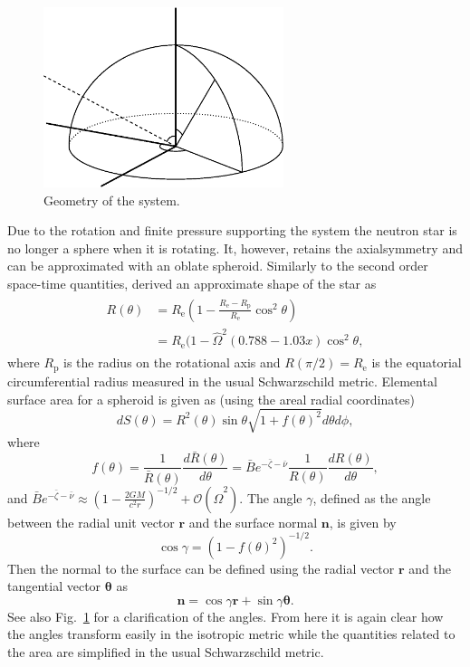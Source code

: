 \documentclass[iop, usenatbib]{emulateapj}
\newcommand{\be}{\begin{equation}}
\newcommand{\ee}{\end{equation}}
\renewcommand{\vec}[1]{\ensuremath{\boldsymbol{#1}}​}
\newcommand{\Req}{\ensuremath{R_{\mathrm{e}}}}
\newcommand{\sch}{Schwarzschild }
\newcommand{\Ob}{\ensuremath{\hat{\Omega}}}
\newcommand{\nub}{\ensuremath{\bar{\nu}}}
\newcommand{\zetab}{\ensuremath{\bar{\zeta}}}
\newcommand{\Bb}{\ensuremath{\bar{B}}}
\begin{document}
\begin{figure}
\centering
\includegraphics[width=7cm]{figs/fig1.eps}
\caption{\label{fig:geom}
  Geometry of the system.
}
\end{figure}


Due to the rotation and finite pressure supporting the system the neutron star is no longer a sphere when it is rotating.
It, however, retains the axialsymmetry and can be approximated with an oblate spheroid.
Similarly to the second order space-time quantities, \citet{aGM14} derived an approximate shape of the star as
\begin{align}\begin{split}\label{eq:radf}
    R(\theta) &= \Req \left( 1 - \frac{\Req - R_{\mathrm{p}}}{\Req} \cos^2\theta \right) \\
              &= \Req (1-\Ob^2 (0.788 - 1.03x) \cos^2 \theta,
\end{split}\end{align}
where $R_{\mathrm{p}}$ is the radius on the rotational axis and $R(\pi/2) = \Req$ is the equatorial circumferential radius measured in the usual \sch metric. 
Elemental surface area for a spheroid is given as (using the areal radial coordinates)
\be
dS(\theta) = R^2(\theta) \sin\theta \sqrt{1 + f(\theta)^2}d\theta d\phi,
\ee
where
\be
f(\theta) = \frac{1}{\bar{R}(\theta)} \frac{d \bar{R}(\theta)}{d \theta} = \Bb e^{-\zetab-\nub} \frac{1}{R(\theta)} \frac{dR(\theta)}{d\theta}, 
\ee
and $\Bb e^{-\zetab-\nub} \approx (1-\frac{2 G M}{c^2 r})^{-1/2} + \mathcal{O}(\Ob^2)$.
The angle $\gamma$, defined as the angle between the radial unit vector $\vec{r}$ and the surface normal $\vec{n}$, is given by
\be
\cos\gamma = (1 - f(\theta)^2)^{-1/2}.
\ee
Then the normal to the surface can be defined using the radial vector $\vec{r}$ and the tangential vector $\vec{\theta}$ as
\be
\vec{n} = \cos\gamma \vec{r} + \sin\gamma \vec{\theta}.
\ee
See also Fig.~\ref{fig:geom} for a clarification of the angles.
From here it is again clear how the angles transform easily in the isotropic metric while the quantities related to the area are simplified in the usual \sch metric.
\end{document}
